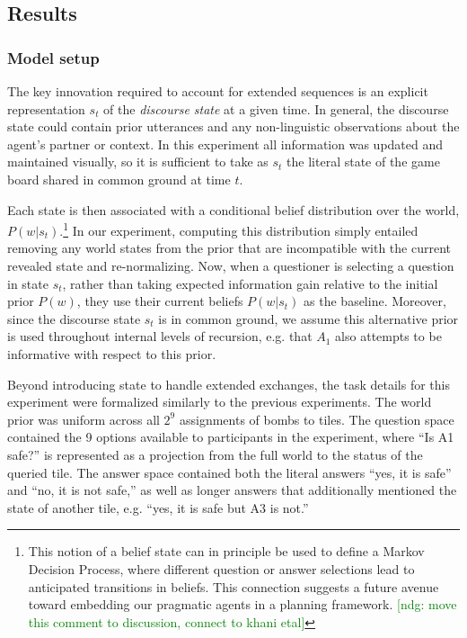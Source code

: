 \documentclass[11pt, floatsintext]{apa6}
\newcommand{\ndg}[1]{\textcolor{Green}{[ndg: #1]}}
\begin{document}
\subsection{Results}

\subsubsection{Model setup}

The key innovation required to account for extended sequences is an explicit representation $s_t$ of the \emph{discourse state} at a given time. 
In general, the discourse state could contain prior utterances and any non-linguistic observations about the agent's partner or context.
In this experiment all information was updated and maintained visually, so it is sufficient to take as $s_t$ the literal state of the game board shared in common ground at time $t$.

Each state is then associated with a conditional belief distribution over the world, $P(w | s_t)$.\footnote{This notion of a belief state can in principle be used to define a Markov Decision Process, where different question or answer selections lead to anticipated transitions in beliefs. This connection suggests a future avenue toward embedding our pragmatic agents in a planning framework. \ndg{move this comment to discussion, connect to khani etal}}
In our experiment, computing this distribution simply entailed removing any world states from the prior that are incompatible with the current revealed state and re-normalizing.
Now, when a questioner is selecting a question in state $s_t$, rather than taking expected information gain relative to the initial prior $P(w)$, they use their current beliefs $P(w | s_t)$ as the baseline.
Moreover, since the discourse state $s_t$ is in common ground, we assume this alternative prior is used throughout internal levels of recursion, e.g. that $A_1$ also attempts to be informative with respect to this prior.

Beyond introducing state to handle extended exchanges, the task details for this experiment were formalized similarly to the previous experiments.
The world prior was uniform across all $2^9$ assignments of bombs to tiles. 
The question space contained the 9 options available to participants in the experiment, where ``Is A1 safe?'' is represented as a projection from the full world to the status of the queried tile. 
The answer space contained both the literal answers ``yes, it is safe'' and ``no, it is not safe,'' as well as longer answers that additionally mentioned the state of another tile, e.g. ``yes, it is safe but A3 is not.''
\end{document}
